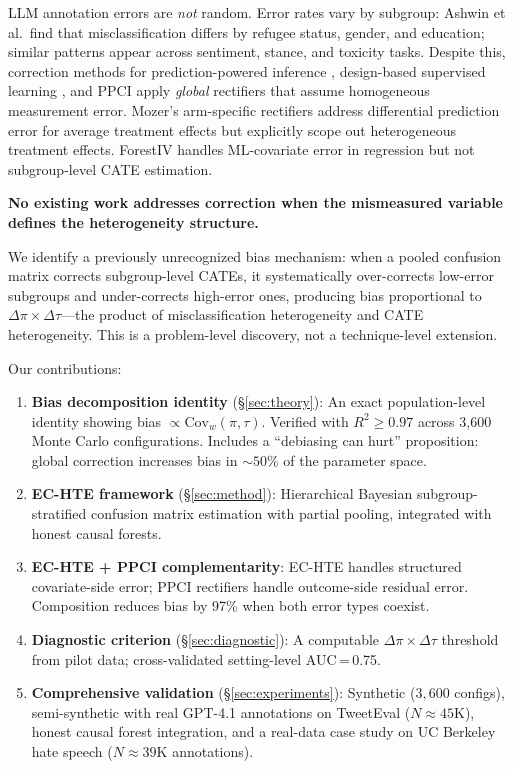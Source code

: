 \documentclass[11pt,twocolumn]{article}
\theoremstyle{remark}
\newcommand{\Cov}{\mathrm{Cov}}
\begin{document}
LLM annotation errors are \emph{not} random.
Error rates vary by subgroup: Ashwin et al.\ find that misclassification differs by refugee status, gender, and education; similar patterns appear across sentiment, stance, and toxicity tasks.
Despite this, correction methods for prediction-powered inference \cite{angelopoulos2023prediction}, design-based supervised learning \cite{egami2024using}, and PPCI \cite{sui2026ppci} apply \emph{global} rectifiers that assume homogeneous measurement error.
Mozer's arm-specific rectifiers \cite{mozer2026} address differential prediction error for average treatment effects but explicitly scope out heterogeneous treatment effects.
ForestIV \cite{bu2023treatment} handles ML-covariate error in regression but not subgroup-level CATE estimation.

\textbf{No existing work addresses correction when the mismeasured variable defines the heterogeneity structure.}

We identify a previously unrecognized bias mechanism: when a pooled confusion matrix corrects subgroup-level CATEs, it systematically over-corrects low-error subgroups and under-corrects high-error ones, producing bias proportional to $\Delta\pi \times \Delta\tau$---the product of misclassification heterogeneity and CATE heterogeneity.
This is a problem-level discovery, not a technique-level extension.

Our contributions:
\begin{enumerate}
\item \textbf{Bias decomposition identity} (\S\ref{sec:theory}): An exact population-level identity showing bias $\propto \Cov_w(\pi, \tau)$.  Verified with $R^2 \geq 0.97$ across 3{,}600 Monte Carlo configurations.  Includes a ``debiasing can hurt'' proposition: global correction increases bias in ${\sim}50\%$ of the parameter space.
\item \textbf{EC-HTE framework} (\S\ref{sec:method}): Hierarchical Bayesian subgroup-stratified confusion matrix estimation with partial pooling, integrated with honest causal forests.
\item \textbf{EC-HTE + PPCI complementarity}: EC-HTE handles structured covariate-side error; PPCI rectifiers handle outcome-side residual error.  Composition reduces bias by 97\% when both error types coexist.
\item \textbf{Diagnostic criterion} (\S\ref{sec:diagnostic}): A computable $\Delta\pi \times \Delta\tau$ threshold from pilot data; cross-validated setting-level AUC\,=\,0.75.
\item \textbf{Comprehensive validation} (\S\ref{sec:experiments}): Synthetic ($3{,}600$ configs), semi-synthetic with real GPT-4.1 annotations on TweetEval ($N{\approx}45$K), honest causal forest integration, and a real-data case study on UC Berkeley hate speech ($N{\approx}39$K annotations).
\end{enumerate}
\end{document}
